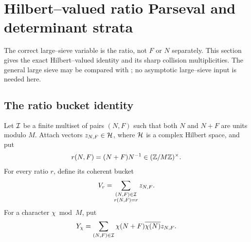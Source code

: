 \section{Hilbert--valued ratio Parseval and determinant strata}
\label{sec:tpc38-ratio-parseval}

The correct large--sieve variable is the ratio, not \(F\) or \(N\)
separately.  This section gives the exact Hilbert--valued identity and its
sharp collision multiplicities.  The general large sieve may be compared
with \citep{Bombieri1965,IwaniecKowalski2004}; no asymptotic large--sieve
input is needed here.

\subsection{The ratio bucket identity}

Let \(\mathcal I\) be a finite multiset of pairs \((N,F)\) such that both
\(N\) and \(N+F\) are units modulo \(M\).  Attach vectors
\(z_{N,F}\in\mathcal H\), where \(\mathcal H\) is a complex Hilbert space, and put
\begin{equation}
 r(N,F)=(N+F)N^{-1}\in(\mathbb Z/M\mathbb Z)^\times.
 \label{eq:tpc38-ratio-map}
\end{equation}
For every ratio \(r\), define its coherent bucket
\begin{equation}
 V_r=\sum_{\substack{(N,F)\in\mathcal I\\r(N,F)=r}}z_{N,F}.
 \label{eq:tpc38-ratio-bucket}
\end{equation}
For a character \(\chi\bmod M\), put
\begin{equation}
 Y_\chi=\sum_{(N,F)\in\mathcal I}
 \chi(N+F)\overline{\chi(N)}z_{N,F}.
 \label{eq:tpc38-Ychi}
\end{equation}


